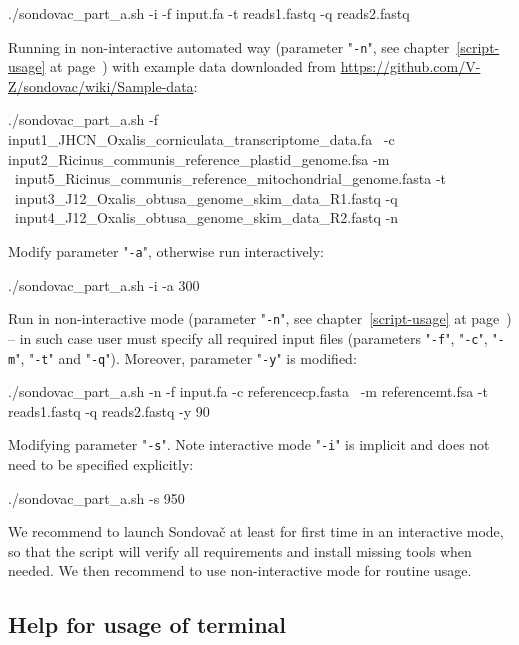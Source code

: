 \documentclass[a4paper, 11pt, twoside]{article}
\begin{document}
\begin{bashcode}
  ./sondovac_part_a.sh -i -f input.fa -t reads1.fastq -q reads2.fastq
\end{bashcode}

Running in non-interactive automated way (parameter "\texttt{-n}", see chapter~\ref{script-usage} at page~\pageref{script-usage}) with 
example data downloaded from \href{https://github.com/V-Z/sondovac/wiki/Sample-data}{https://github.com/V-Z/sondovac/wiki/Sample-data}:

\begin{bashcode}
  ./sondovac_part_a.sh -f input1_JHCN_Oxalis_corniculata_transcriptome_data.fa \
   -c input2_Ricinus_communis_reference_plastid_genome.fsa -m \
   input5_Ricinus_communis_reference_mitochondrial_genome.fasta -t \
   input3_J12_Oxalis_obtusa_genome_skim_data_R1.fastq -q \
   input4_J12_Oxalis_obtusa_genome_skim_data_R2.fastq -n
\end{bashcode}

Modify parameter "\texttt{-a}", otherwise run interactively:

\begin{bashcode}
  ./sondovac_part_a.sh -i -a 300
\end{bashcode}

Run in non-interactive mode (parameter "\texttt{-n}", see chapter~\ref{script-usage} at page~\pageref{script-usage}) -- in such case user must specify all required input files (parameters "\texttt{-f}", "\texttt{-c}", "\texttt{-m}", "\texttt{-t}" and "\texttt{-q}"). Moreover, parameter "\texttt{-y}" is modified:

\begin{bashcode}
  ./sondovac_part_a.sh -n -f input.fa -c referencecp.fasta \
   -m referencemt.fsa -t reads1.fastq -q reads2.fastq -y 90
\end{bashcode}

Modifying parameter "\texttt{-s}". Note interactive mode "\texttt{-i}" is implicit and does not need to be specified explicitly:

\begin{bashcode}
  ./sondovac_part_a.sh -s 950
\end{bashcode}

We recommend to launch Sondovač at least for first time in an interactive mode, so that the script will verify all requirements and install missing tools when needed. We then recommend to use non-interactive mode for routine usage.

\subsection{Help for usage of terminal}
\end{document}
